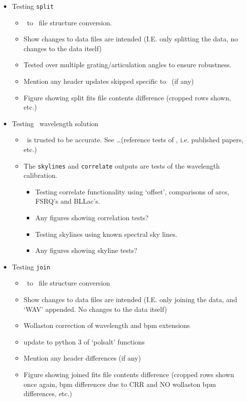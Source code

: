 \begin{itemize}
    
    \item Testing \texttt{split}
    \begin{itemize}
        \item \polsalt\ to \iraf\ file structure conversion.
        \item Show changes to data files are intended (I.E. only splitting the data, no changes to the data itself)
        \item Tested over multiple grating/articulation angles to ensure robustness.
        \item Mention any header updates skipped specific to \polsalt\ (if any)
        \item Figure showing split fits file contents difference (cropped rows shown, etc.)
    \end{itemize}
    
    \item Testing \iraf\ wavelength solution
    \begin{itemize}
        \item \iraf\ is trusted to be accurate. See \dots (reference tests of \iraf, i.e. published papers, etc.)
        \item The \texttt{skylines} and \texttt{correlate} outputs are tests of the wavelength calibration.
        \begin{itemize}
            \item Testing correlate functionality using `offset', comparisons of arcs, FSRQ's and BLLac's.
            \item Any figures showing correlation tests?
            \item Testing skylines using known spectral sky lines.
            \item Any figures showing skyline tests?
        \end{itemize}
    \end{itemize}

    \item Testing \texttt{join}
    \begin{itemize}
        \item \iraf\ to \polsalt\ file structure conversion
        \item Show changes to data files are intended (I.E. only joining the data, and `WAV' appended. No changes to the data itself)
        \item Wollaston correction of wavelength and bpm extensions
        \item update to python 3 of `polsalt' functions
        \item Mention any header differences (if any)
        \item Figure showing joined fits file contents difference (cropped rows shown once again, bpm differences due to CRR and NO wollaston bpm differences, etc.)
    \end{itemize}


\end{itemize}
